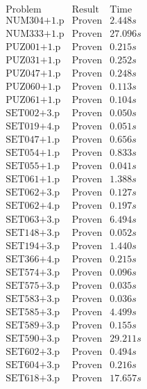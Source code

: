 \documentclass[a4paper,11pt]{report}
\theoremstyle{definition}
\theoremstyle{definition}
\theoremstyle{definition}
\theoremstyle{definition}
\theoremstyle{definition}
\theoremstyle{definition}
\theoremstyle{definition}
\begin{document}
	\begin{minipage}{0.45\textwidth}
		\[\begin{matrix}
			\text{Problem}&\text{Result}&\text{Time}\\
			\text{NUM304+1.p}&\text{Proven}& 2.448 s\\
			\text{NUM333+1.p}&\text{Proven}& 27.096 s\\
			\text{PUZ001+1.p}&\text{Proven}& 0.215 s\\
			\text{PUZ031+1.p}&\text{Proven}& 0.252 s\\
			\text{PUZ047+1.p}&\text{Proven}& 0.248 s\\
			\text{PUZ060+1.p}&\text{Proven}& 0.113 s\\
			\text{PUZ061+1.p}&\text{Proven}& 0.104 s\\
			\text{SET002+3.p}&\text{Proven}& 0.050 s\\
			\text{SET019+4.p}&\text{Proven}& 0.051 s\\
			\text{SET047+1.p}&\text{Proven}& 0.656 s\\
			\text{SET054+1.p}&\text{Proven}& 0.833 s\\
			\text{SET055+1.p}&\text{Proven}& 0.041 s\\
			\text{SET061+1.p}&\text{Proven}& 1.388 s\\
			\text{SET062+3.p}&\text{Proven}& 0.127 s\\
			\text{SET062+4.p}&\text{Proven}& 0.197 s\\
			\text{SET063+3.p}&\text{Proven}& 6.494 s\\
			\text{SET148+3.p}&\text{Proven}& 0.052 s\\
			\text{SET194+3.p}&\text{Proven}& 1.440 s\\
			\text{SET366+4.p}&\text{Proven}& 0.215 s\\
			\text{SET574+3.p}&\text{Proven}& 0.096 s\\
			\text{SET575+3.p}&\text{Proven}& 0.035 s\\
			\text{SET583+3.p}&\text{Proven}& 0.036 s\\
			\text{SET585+3.p}&\text{Proven}& 4.499 s\\
			\text{SET589+3.p}&\text{Proven}& 0.155 s\\
			\text{SET590+3.p}&\text{Proven}& 29.211 s\\
			\text{SET602+3.p}&\text{Proven}& 0.494 s\\
			\text{SET604+3.p}&\text{Proven}& 0.216 s\\
			\text{SET618+3.p}&\text{Proven}& 17.657 s\\

\end{matrix}\]
\end{minipage}
\end{document}
